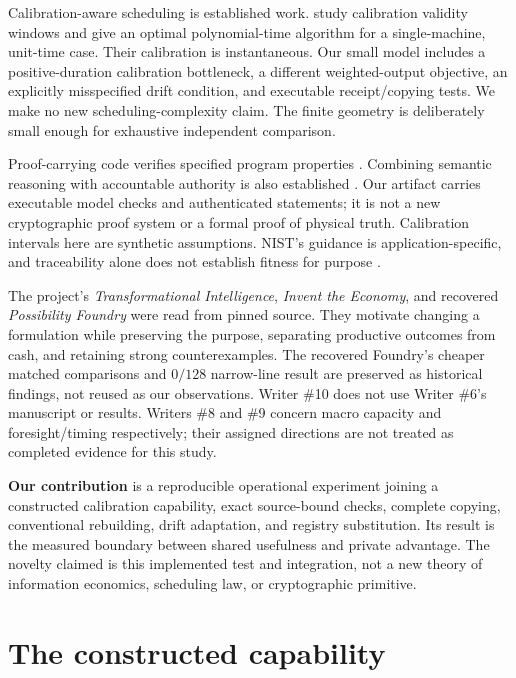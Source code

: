 Calibration-aware scheduling is established work. \citet{bender2013} study calibration validity windows and give an optimal polynomial-time algorithm for a single-machine, unit-time case. Their calibration is instantaneous. Our small model includes a positive-duration calibration bottleneck, a different weighted-output objective, an explicitly misspecified drift condition, and executable receipt/copying tests. We make no new scheduling-complexity claim. The finite geometry is deliberately small enough for exhaustive independent comparison.

Proof-carrying code verifies specified program properties \citep{neculalee1996,necula1997}. Combining semantic reasoning with accountable authority is also established \citep{whitehead2004}. Our artifact carries executable model checks and authenticated statements; it is not a new cryptographic proof system or a formal proof of physical truth. Calibration intervals here are synthetic assumptions. NIST's guidance is application-specific, and traceability alone does not establish fitness for purpose \citep{nistinterval2026,nisttraceability2021}.

The project's \emph{Transformational Intelligence}, \emph{Invent the Economy}, and recovered \emph{Possibility Foundry} were read from pinned source. They motivate changing a formulation while preserving the purpose, separating productive outcomes from cash, and retaining strong counterexamples. The recovered Foundry's cheaper matched comparisons and $0/128$ narrow-line result are preserved as historical findings, not reused as our observations. Writer \#10 does not use Writer \#6's manuscript or results. Writers \#8 and \#9 concern macro capacity and foresight/timing respectively; their assigned directions are not treated as completed evidence for this study.

\textbf{Our contribution} is a reproducible operational experiment joining a constructed calibration capability, exact source-bound checks, complete copying, conventional rebuilding, drift adaptation, and registry substitution. Its result is the measured boundary between shared usefulness and private advantage. The novelty claimed is this implemented test and integration, not a new theory of information economics, scheduling law, or cryptographic primitive.

\section{The constructed capability}
